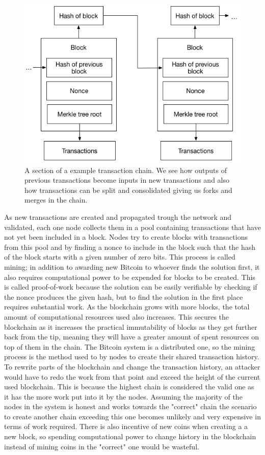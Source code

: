 \begin{figure}[h]  %
  \centering
  \includegraphics[width=.7\textwidth]{figures/blockchain}
  \caption[Transaction chain]{A section of a example transaction chain. We see how outputs of previous transactions become inputs in new transactions and also how transactions can be split and consolidated giving us forks and merges in the chain.}
  \label{fig:blockchain}
\end{figure}

As new transactions are created and propagated trough the network and validated, each one node collects them in a pool containing transactions that have not yet been included in a block. Nodes try to create blocks with transactions from this pool and by finding a nonce to include in the block such that the hash of the block starts with a given number of zero bits. This process is called mining; in addition to awarding new Bitcoin to whoever finds the solution first, it also requires computational power to be expended for blocks to be created. This is called proof-of-work because the solution can be easily verifiable by checking if the nonce produces the given hash, but to find the solution in the first place requires substantial work. As the blockchain grows with more blocks, the total amount of computational resources used also increases. This secures the blockchain as it increases the practical immutability of blocks as they get further back from the tip, meaning they will have a greater amount of spent resources on top of them in the chain. The Bitcoin system is a distributed one, so the mining process is the method used to by nodes to create their shared transaction history.
To rewrite parts of the blockchain and change the transaction history, an attacker would have to redo the work from that point and exceed the height of the current used blockchain. This is because the highest chain is considered the valid one as it has the more work put into it by the nodes. Assuming the majority of the nodes in the system is honest and works towards the "correct" chain the scenario to create another chain exceeding this one becomes unlikely and very expensive in terms of work required. There is also incentive of new coins when creating a a new block, so spending computational power to change history in the blockchain instead of mining coins in the "correct" one would be wasteful. 


